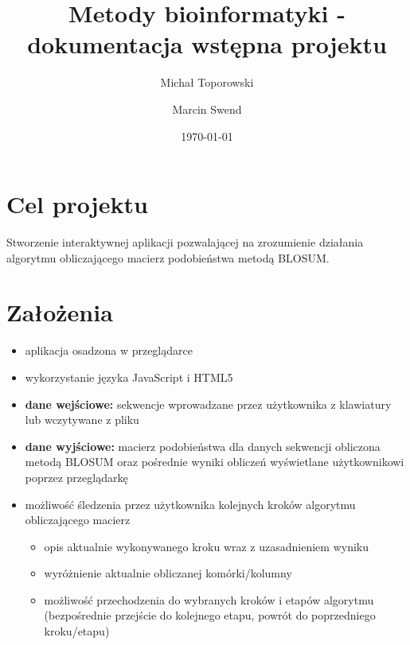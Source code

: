\documentclass[a4paper,12pt]{article}
\title{Metody bioinformatyki - dokumentacja wstępna projektu}
\author{Michał Toporowski \and Marcin Swend}
\date{\today}
\begin{document}
\maketitle
\section{Cel projektu}
Stworzenie interaktywnej aplikacji pozwalającej na zrozumienie działania algorytmu obliczającego macierz podobieństwa metodą BLOSUM.

\section{Założenia}
\begin{itemize}
\item aplikacja osadzona w przeglądarce 
\item wykorzystanie języka JavaScript i HTML5
\item \textbf{dane wejściowe:} sekwencje wprowadzane przez użytkownika z klawiatury lub wczytywane z pliku
\item \textbf{dane wyjściowe:} macierz podobieństwa dla danych sekwencji obliczona metodą BLOSUM oraz pośrednie wyniki obliczeń wyświetlane użytkownikowi poprzez przeglądarkę
\item możliwość śledzenia przez użytkownika kolejnych kroków algorytmu obliczającego macierz
\begin{itemize}
\item opis aktualnie wykonywanego kroku wraz z uzasadnieniem wyniku
\item wyróżnienie aktualnie obliczanej komórki/kolumny
\item możliwość przechodzenia do wybranych kroków i etapów algorytmu (bezpośrednie przejście do kolejnego etapu, powrót do poprzedniego kroku/etapu)
\end{itemize}
\end{itemize}
\end{document}
